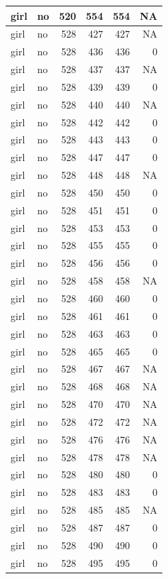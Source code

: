 \documentclass[man]{apa6}
\begin{document}
\begin{tabular}{l|l|r|r|r|r}
\hline
girl & no & 520 & 554 & 554 & NA\\
\hline
girl & no & 528 & 427 & 427 & NA\\
\hline
girl & no & 528 & 436 & 436 & 0\\
\hline
girl & no & 528 & 437 & 437 & NA\\
\hline
girl & no & 528 & 439 & 439 & 0\\
\hline
girl & no & 528 & 440 & 440 & NA\\
\hline
girl & no & 528 & 442 & 442 & 0\\
\hline
girl & no & 528 & 443 & 443 & 0\\
\hline
girl & no & 528 & 447 & 447 & 0\\
\hline
girl & no & 528 & 448 & 448 & NA\\
\hline
girl & no & 528 & 450 & 450 & 0\\
\hline
girl & no & 528 & 451 & 451 & 0\\
\hline
girl & no & 528 & 453 & 453 & 0\\
\hline
girl & no & 528 & 455 & 455 & 0\\
\hline
girl & no & 528 & 456 & 456 & 0\\
\hline
girl & no & 528 & 458 & 458 & NA\\
\hline
girl & no & 528 & 460 & 460 & 0\\
\hline
girl & no & 528 & 461 & 461 & 0\\
\hline
girl & no & 528 & 463 & 463 & 0\\
\hline
girl & no & 528 & 465 & 465 & 0\\
\hline
girl & no & 528 & 467 & 467 & NA\\
\hline
girl & no & 528 & 468 & 468 & NA\\
\hline
girl & no & 528 & 470 & 470 & NA\\
\hline
girl & no & 528 & 472 & 472 & NA\\
\hline
girl & no & 528 & 476 & 476 & NA\\
\hline
girl & no & 528 & 478 & 478 & NA\\
\hline
girl & no & 528 & 480 & 480 & 0\\
\hline
girl & no & 528 & 483 & 483 & 0\\
\hline
girl & no & 528 & 485 & 485 & NA\\
\hline
girl & no & 528 & 487 & 487 & 0\\
\hline
girl & no & 528 & 490 & 490 & 0\\
\hline
girl & no & 528 & 495 & 495 & 0\\

\end{tabular}
\end{document}
